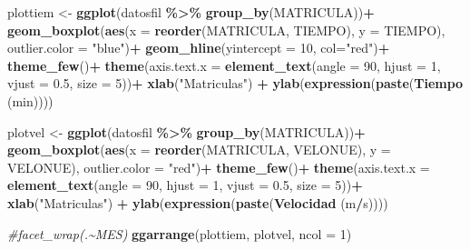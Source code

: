\documentclass[
]{article}
\newenvironment{Shaded}{\begin{snugshade}}{\end{snugshade}}
\newcommand{\AttributeTok}[1]{\textcolor[rgb]{0.13,0.29,0.53}{#1}}
\newcommand{\CommentTok}[1]{\textcolor[rgb]{0.56,0.35,0.01}{\textit{#1}}}
\newcommand{\DecValTok}[1]{\textcolor[rgb]{0.00,0.00,0.81}{#1}}
\newcommand{\FloatTok}[1]{\textcolor[rgb]{0.00,0.00,0.81}{#1}}
\newcommand{\FunctionTok}[1]{\textcolor[rgb]{0.13,0.29,0.53}{\textbf{#1}}}
\newcommand{\NormalTok}[1]{#1}
\newcommand{\OtherTok}[1]{\textcolor[rgb]{0.56,0.35,0.01}{#1}}
\newcommand{\SpecialCharTok}[1]{\textcolor[rgb]{0.81,0.36,0.00}{\textbf{#1}}}
\newcommand{\StringTok}[1]{\textcolor[rgb]{0.31,0.60,0.02}{#1}}
\begin{document}
\begin{Shaded}
\begin{Highlighting}[]
\NormalTok{plottiem }\OtherTok{\textless{}{-}} \FunctionTok{ggplot}\NormalTok{(datosfil }\SpecialCharTok{\%\textgreater{}\%} 
               \FunctionTok{group\_by}\NormalTok{(MATRICULA))}\SpecialCharTok{+}
  \FunctionTok{geom\_boxplot}\NormalTok{(}\FunctionTok{aes}\NormalTok{(}\AttributeTok{x =} \FunctionTok{reorder}\NormalTok{(MATRICULA, TIEMPO), }
                   \AttributeTok{y =}\NormalTok{ TIEMPO),}
               \AttributeTok{outlier.color  =} \StringTok{"blue"}\NormalTok{)}\SpecialCharTok{+}
  \FunctionTok{geom\_hline}\NormalTok{(}\AttributeTok{yintercept =} \DecValTok{10}\NormalTok{, }
             \AttributeTok{col=}\StringTok{"red"}\NormalTok{)}\SpecialCharTok{+}
  \FunctionTok{theme\_few}\NormalTok{()}\SpecialCharTok{+}
  \FunctionTok{theme}\NormalTok{(}\AttributeTok{axis.text.x =} \FunctionTok{element\_text}\NormalTok{(}\AttributeTok{angle =} \DecValTok{90}\NormalTok{,}
                                     \AttributeTok{hjust =} \DecValTok{1}\NormalTok{,}
                                     \AttributeTok{vjust =} \FloatTok{0.5}\NormalTok{,}
                                     \AttributeTok{size =} \DecValTok{5}\NormalTok{))}\SpecialCharTok{+}
  \FunctionTok{xlab}\NormalTok{(}\StringTok{"Matriculas"}\NormalTok{) }\SpecialCharTok{+}
  \FunctionTok{ylab}\NormalTok{(}\FunctionTok{expression}\NormalTok{(}\FunctionTok{paste}\NormalTok{(}\FunctionTok{Tiempo}\NormalTok{ (min))))}

\NormalTok{plotvel }\OtherTok{\textless{}{-}} \FunctionTok{ggplot}\NormalTok{(datosfil }\SpecialCharTok{\%\textgreater{}\%} 
               \FunctionTok{group\_by}\NormalTok{(MATRICULA))}\SpecialCharTok{+}
  \FunctionTok{geom\_boxplot}\NormalTok{(}\FunctionTok{aes}\NormalTok{(}\AttributeTok{x =} \FunctionTok{reorder}\NormalTok{(MATRICULA, VELONUE),}
                   \AttributeTok{y =}\NormalTok{ VELONUE),}
               \AttributeTok{outlier.color  =} \StringTok{"red"}\NormalTok{)}\SpecialCharTok{+}
  \FunctionTok{theme\_few}\NormalTok{()}\SpecialCharTok{+}
  \FunctionTok{theme}\NormalTok{(}\AttributeTok{axis.text.x =} \FunctionTok{element\_text}\NormalTok{(}\AttributeTok{angle =} \DecValTok{90}\NormalTok{,}
                                     \AttributeTok{hjust =} \DecValTok{1}\NormalTok{,}
                                     \AttributeTok{vjust =} \FloatTok{0.5}\NormalTok{,}
                                     \AttributeTok{size =} \DecValTok{5}\NormalTok{))}\SpecialCharTok{+}
  \FunctionTok{xlab}\NormalTok{(}\StringTok{"Matriculas"}\NormalTok{) }\SpecialCharTok{+}
  \FunctionTok{ylab}\NormalTok{(}\FunctionTok{expression}\NormalTok{(}\FunctionTok{paste}\NormalTok{(}\FunctionTok{Velocidad}\NormalTok{ (m}\SpecialCharTok{/}\NormalTok{s))))}
  
  \CommentTok{\#facet\_wrap(.\textasciitilde{}MES)}
\FunctionTok{ggarrange}\NormalTok{(plottiem, plotvel, }\AttributeTok{ncol =} \DecValTok{1}\NormalTok{)}
\end{Highlighting}
\end{Shaded}
\end{document}
